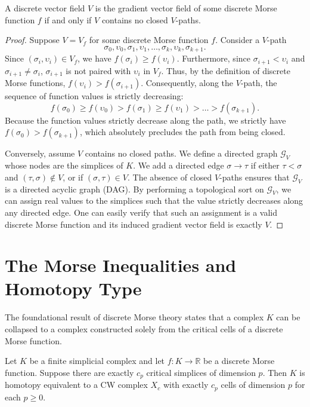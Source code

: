 \begin{theorem}
\label{thm:gradient_no_closed_paths}
A discrete vector field $V$ is the gradient vector field of some discrete Morse function $f$ if and only if $V$ contains no closed $V$-paths.
\end{theorem}

\begin{proof}
Suppose $V = V_f$ for some discrete Morse function $f$. Consider a $V$-path
\[ \sigma_0, \upsilon_0, \sigma_1, \upsilon_1, \dots, \sigma_k, \upsilon_k, \sigma_{k+1}. \]
Since $(\sigma_i, \upsilon_i) \in V_f$, we have $f(\sigma_i) \ge f(\upsilon_i)$. Furthermore, since $\sigma_{i+1} < \upsilon_i$ and $\sigma_{i+1} \neq \sigma_i$, $\sigma_{i+1}$ is not paired with $\upsilon_i$ in $V_f$. Thus, by the definition of discrete Morse functions, $f(\upsilon_i) > f(\sigma_{i+1})$.
Consequently, along the $V$-path, the sequence of function values is strictly decreasing:
\[ f(\sigma_0) \ge f(\upsilon_0) > f(\sigma_1) \ge f(\upsilon_1) > \dots > f(\sigma_{k+1}). \]
Because the function values strictly decrease along the path, we strictly have $f(\sigma_0) > f(\sigma_{k+1})$, which absolutely precludes the path from being closed.

Conversely, assume $V$ contains no closed paths. We define a directed graph $\mathcal{G}_V$ whose nodes are the simplices of $K$. We add a directed edge $\sigma \to \tau$ if either $\tau < \sigma$ and $(\tau, \sigma) \notin V$, or if $(\sigma, \tau) \in V$. The absence of closed $V$-paths ensures that $\mathcal{G}_V$ is a directed acyclic graph (DAG). 
By performing a topological sort on $\mathcal{G}_V$, we can assign real values to the simplices such that the value strictly decreases along any directed edge. One can easily verify that such an assignment is a valid discrete Morse function and its induced gradient vector field is exactly $V$.
\end{proof}

\section{The Morse Inequalities and Homotopy Type}

The foundational result of discrete Morse theory states that a complex $K$ can be collapsed to a complex constructed solely from the critical cells of a discrete Morse function.

\begin{theorem}
\label{thm:fundamental}
Let $K$ be a finite simplicial complex and let $f: K \to \mathbb{R}$ be a discrete Morse function. Suppose there are exactly $c_p$ critical simplices of dimension $p$. Then $K$ is homotopy equivalent to a CW complex $X_c$ with exactly $c_p$ cells of dimension $p$ for each $p \ge 0$.
\end{theorem}


